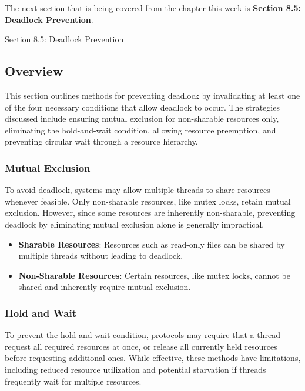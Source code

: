 The next section that is being covered from the chapter this week is \textbf{Section 8.5: Deadlock Prevention}.

\begin{notes}{Section 8.5: Deadlock Prevention}
    \subsection*{Overview}

    This section outlines methods for preventing deadlock by invalidating at least one of the four necessary conditions that allow deadlock to occur. The strategies discussed include ensuring mutual 
    exclusion for non-sharable resources only, eliminating the hold-and-wait condition, allowing resource preemption, and preventing circular wait through a resource hierarchy.
    
    \subsubsection*{Mutual Exclusion}
    
    To avoid deadlock, systems may allow multiple threads to share resources whenever feasible. Only non-sharable resources, like mutex locks, retain mutual exclusion. However, since some resources 
    are inherently non-sharable, preventing deadlock by eliminating mutual exclusion alone is generally impractical.
    
    \begin{highlight}
    
        \begin{itemize}
            \item \textbf{Sharable Resources}: Resources such as read-only files can be shared by multiple threads without leading to deadlock.
            \item \textbf{Non-Sharable Resources}: Certain resources, like mutex locks, cannot be shared and inherently require mutual exclusion.
        \end{itemize}
    
    \end{highlight}
    
    \subsubsection*{Hold and Wait}
    
    To prevent the hold-and-wait condition, protocols may require that a thread request all required resources at once, or release all currently held resources before requesting additional ones. While 
    effective, these methods have limitations, including reduced resource utilization and potential starvation if threads frequently wait for multiple resources.
    

\end{notes}
